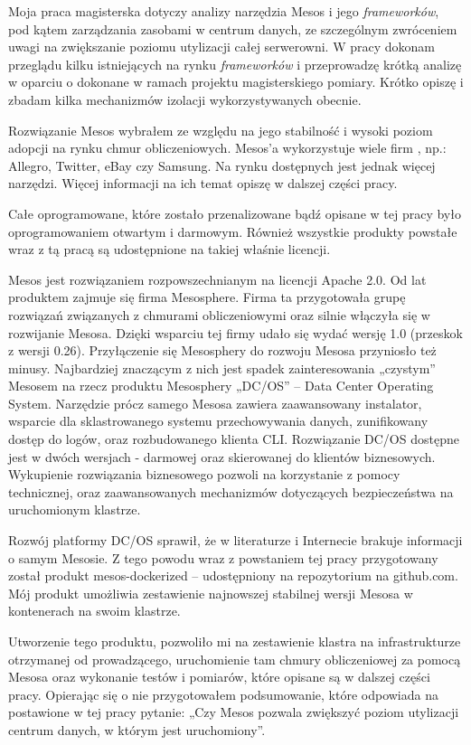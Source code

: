 \documentclass[10pt,a4paper,titlepage,twoside]{report}
\begin{document}
Moja praca magisterska dotyczy analizy narzędzia Mesos i jego \textit{frameworków}, pod kątem zarządzania zasobami w centrum danych, ze szczególnym zwróceniem uwagi na zwiększanie poziomu utylizacji całej serwerowni. W pracy dokonam przeglądu kilku istniejących na rynku \textit{frameworków} i przeprowadzę krótką analizę w oparciu o dokonane w ramach projektu magisterskiego pomiary. Krótko opiszę i zbadam kilka mechanizmów izolacji wykorzystywanych obecnie.

Rozwiązanie Mesos wybrałem ze względu na jego stabilność i wysoki poziom adopcji na rynku chmur obliczeniowych. Mesos’a wykorzystuje wiele firm \cite{ad16}, np.: Allegro, Twitter, eBay czy Samsung. Na rynku dostępnych jest jednak więcej narzędzi. Więcej informacji na ich temat opiszę w dalszej części pracy.

Całe oprogramowane, które zostało przenalizowane bądź opisane w tej pracy było oprogramowaniem otwartym i darmowym. Również wszystkie produkty powstałe wraz z tą pracą są udostępnione na takiej właśnie licencji.

Mesos jest rozwiązaniem rozpowszechnianym na licencji Apache 2.0. Od lat produktem zajmuje się firma Mesosphere. Firma ta przygotowała grupę rozwiązań związanych z chmurami obliczeniowymi oraz silnie włączyła się w rozwijanie Mesosa. Dzięki wsparciu tej firmy udało się wydać wersję 1.0 (przeskok z wersji 0.26). Przyłączenie się Mesosphery do rozwoju Mesosa przyniosło też minusy. Najbardziej znaczącym z nich jest spadek zainteresowania „czystym” Mesosem na rzecz produktu Mesosphery „DC/OS” – Data Center Operating System. Narzędzie prócz samego Mesosa zawiera zaawansowany instalator, wsparcie dla sklastrowanego systemu przechowywania danych, zunifikowany dostęp do logów, oraz rozbudowanego klienta CLI. Rozwiązanie DC/OS dostępne jest w dwóch wersjach - darmowej oraz skierowanej do klientów biznesowych. Wykupienie rozwiązania biznesowego pozwoli na korzystanie z pomocy technicznej, oraz zaawansowanych mechanizmów dotyczących bezpieczeństwa na uruchomionym klastrze.

Rozwój platformy DC/OS sprawił, że w literaturze i Internecie brakuje informacji o samym Mesosie. Z tego powodu wraz z powstaniem tej pracy przygotowany został produkt mesos-dockerized – udostępniony na repozytorium na github.com. Mój produkt umożliwia zestawienie najnowszej stabilnej wersji Mesosa w kontenerach na swoim klastrze.

Utworzenie tego produktu, pozwoliło mi na zestawienie klastra na infrastrukturze otrzymanej od prowadzącego, uruchomienie tam chmury obliczeniowej za pomocą Mesosa oraz wykonanie testów i pomiarów, które opisane są w dalszej części pracy. Opierając się o nie przygotowałem podsumowanie, które odpowiada na postawione w tej pracy pytanie: „Czy Mesos pozwala zwiększyć poziom utylizacji centrum danych, w którym jest uruchomiony”.
\end{document}
